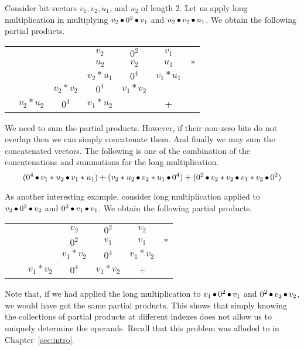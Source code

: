 \begin{example}
  Consider bit-vectors $v_1,v_2,u_1$, and $u_2$ of length 2.
  Let us apply long multiplication in multiplying
  $v_2 \mathop{\bullet} 0^2 \mathop{\bullet} v_1$ and $u_2 \mathop{\bullet} v_2 \mathop{\bullet} u_1$.
  We obtain the following partial products.
\begin{center}
\begin{tabular}{c@{\quad}c@{\quad}c@{\quad}c@{\quad}c@{\quad}c@{\quad}c}
  &&& $v_2$ & $0^2$ & $v_1$&\\ 
  &&& $u_2$ & $v_2$ & $u_1$&$*$\\ \hline
  &&&$v_2*u_1$& $0^4$ & $v_1*u_1$&\\
  &&$v_2*v_2$&$0^4$& $v_1*v_2$ && \\
  &$v_2*u_2$& $0^4$ &$v_1*u_2$&  & +&\\\hline
\end{tabular}
\end{center}
We need to sum the partial products. However, if their non-zero bits 
do not overlap then we can simply concatenate them.
%
And finally we may sum the concatenated vectors.
%
The following is one of the combination of the concatenations and 
summations for the long multiplication.
$$
( 0^4 \mathop{\bullet} v_1*u_2 \mathop{\bullet} v_1*u_1) +
(v_2*u_2 \mathop{\bullet} v_2*u_1 \mathop{\bullet} 0^4) +
(0^2 \mathop{\bullet} v_2*v_2 \mathop{\bullet} v_1*v_2 \mathop{\bullet} 0^2)
$$
\end{example}


\begin{example}

  As another interesting example, consider long multiplication applied to 
  $v_2 \mathop{\bullet} 0^2 \mathop{\bullet} v_2$ and $0^2 \mathop{\bullet} v_1 \mathop{\bullet} v_1$.
  We obtain the following partial products.
\begin{center}
\begin{tabular}{c@{\quad}c@{\quad}c@{\quad}c@{\quad}c@{\quad}c@{\quad}c}
  &&& $v_2$ & $0^2$ & $v_2$&\\ 
  &&& $0^2$ & $v_1$ & $v_1$&$*$\\ \hline
  &&&$v_1*v_2$& $0^4$ & $v_1*v_2$&\\
  &&$v_1*v_2$&$0^4$& $v_1*v_2$ &+&\\\hline
\end{tabular}
\end{center}


Note that, if we had applied the long multiplication to $v_1 \mathop{\bullet}
0^2 \mathop{\bullet} v_1$ and $0^2 \mathop{\bullet} v_2 \mathop{\bullet} v_2$, we would have got
the same partial products. This shows that simply knowing the
collections of partial products at different indexes does not allow us
to uniquely determine the operands. Recall that this problem was
alluded to in Chapter~\ref{sec:intro}

\end{example}



